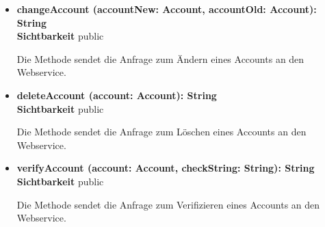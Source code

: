 \begin{itemize}
\item \textbf{changeAccount (accountNew: Account, accountOld: Account): String}\hfill\\
\textbf{Sichtbarkeit} public

Die Methode sendet die Anfrage zum Ändern eines Accounts an den Webservice.

\item \textbf{deleteAccount (account: Account): String}\hfill\\
\textbf{Sichtbarkeit} public

Die Methode sendet die Anfrage zum Löschen eines Accounts an den Webservice.

\item \textbf{verifyAccount (account: Account, checkString: String): String}\hfill\\
\textbf{Sichtbarkeit} public

Die Methode sendet die Anfrage zum Verifizieren eines Accounts an den Webservice.

\end{itemize}
